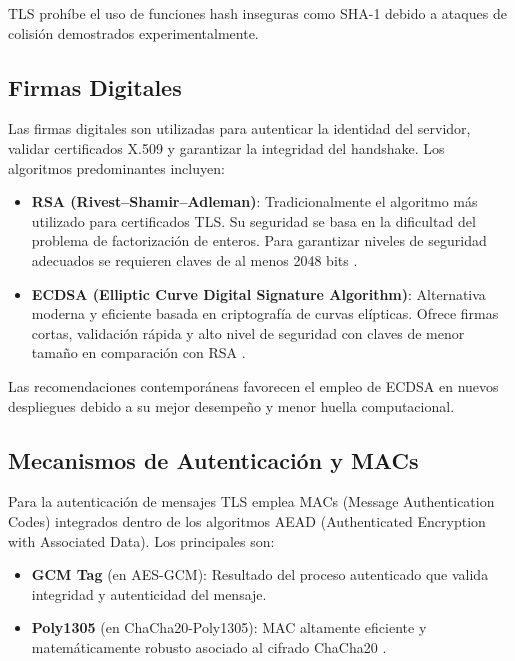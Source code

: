 TLS prohíbe el uso de funciones hash inseguras como SHA-1 debido a ataques de colisión demostrados experimentalmente.

\subsection{Firmas Digitales}

Las firmas digitales son utilizadas para autenticar la identidad del servidor, validar certificados X.509 y garantizar la integridad del handshake. Los algoritmos predominantes incluyen:

\begin{itemize}
    \item \textbf{RSA (Rivest–Shamir–Adleman)}: Tradicionalmente el algoritmo más utilizado para certificados TLS. Su seguridad se basa en la dificultad del problema de factorización de enteros. Para garantizar niveles de seguridad adecuados se requieren claves de al menos 2048 bits \cite{rfc5280}.
    
    \item \textbf{ECDSA (Elliptic Curve Digital Signature Algorithm)}: Alternativa moderna y eficiente basada en criptografía de curvas elípticas. Ofrece firmas cortas, validación rápida y alto nivel de seguridad con claves de menor tamaño en comparación con RSA \cite{krawczyk2016}.
\end{itemize}

Las recomendaciones contemporáneas favorecen el empleo de ECDSA en nuevos despliegues debido a su mejor desempeño y menor huella computacional.

\subsection{Mecanismos de Autenticación y MACs}

Para la autenticación de mensajes TLS emplea MACs (Message Authentication Codes) integrados dentro de los algoritmos AEAD (Authenticated Encryption with Associated Data). Los principales son:

\begin{itemize}
    \item \textbf{GCM Tag} (en AES-GCM): Resultado del proceso autenticado que valida integridad y autenticidad del mensaje.
    \item \textbf{Poly1305} (en ChaCha20-Poly1305): MAC altamente eficiente y matemáticamente robusto asociado al cifrado ChaCha20 \cite{krawczyk2016}.
\end{itemize}

